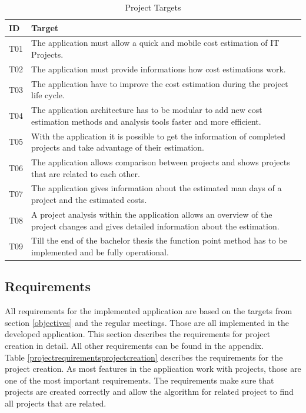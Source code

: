 \begin{table}[h]
	\centering 
	\setlength{\tabcolsep}{4pt}
	\begin{tabular}{|l||p{14cm}|}\hline
		ID		& Target\\ \hline\hline
		T01  	& The application must allow a quick and mobile cost estimation of IT Projects.\\ \hline
		T02  	& The application must provide informations how cost estimations work.\\ \hline
		T03  	& The application have to improve the cost estimation during  the project life cycle.\\ \hline
		T04  	& The application architecture has to be modular to add new cost estimation methods and analysis tools faster and more efficient.\\ \hline
		T05  	& With the application it is possible to get the information of completed projects and take advantage of their estimation.\\ \hline
		T06  	& The application allows comparison between projects and shows projects that are related to each other.\\ \hline
		T07  	& The application gives information about the estimated man days of a project and the estimated costs.\\ \hline
		T08  	& A project analysis within the application allows an overview of the project changes and gives detailed information about the estimation.\\ \hline
		T09  	& Till the end of the bachelor thesis the function point method has to be implemented and be fully operational.\\ \hline
	\end{tabular} 
	\caption{Project Targets} 
	\label{projecttargets} 
\end{table}

\subsection{Requirements}\label{requirements}

All requirements for the implemented application are based on the targets from section \ref{objectives} and the regular meetings. Those are all implemented in the developed application. This section describes the requirements for project creation in detail. All other requirements can be found in the appendix.\\
Table \ref{projectrequirementsprojectcreation} describes the requirements for the project creation. As most features in the application work with projects, those are one of the most important requirements. The requirements make sure that projects are created correctly and allow the algorithm for related project to find all projects that are related.\\

